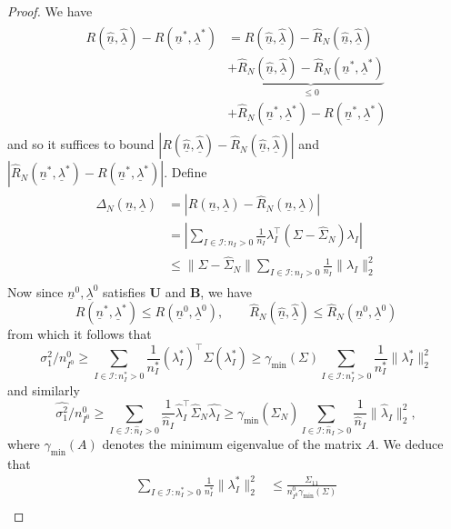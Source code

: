 \documentclass{article} %
\newcommand{\wh}[1]{\widehat{#1}}
\newcommand{\ul}[1]{\underline{#1}}
\begin{document}
\begin{proof}
    We have
    \begin{align}\label{eqn:R}
    \begin{split}
        R(\wh{\ul{n}},\wh{\ul{\lambda}}) - R({\ul{n}}^*,{\ul{\lambda}}^*) &= R(\wh{\ul{n}},\wh{\ul{\lambda}}) - \wh{R}_N(\wh{\ul{n}},\wh{\ul{\lambda}}) \\
        &+ \underbrace{\wh{R}_N(\wh{\ul{n}},\wh{\ul{\lambda}}) - \wh{R}_N({\ul{n}}^*,{\ul{\lambda}}^*)}_{\leq0} \\
        &+ \wh{R}_N({\ul{n}}^*,{\ul{\lambda}}^*) - R({\ul{n}}^*,{\ul{\lambda}}^*)
    \end{split}
    \end{align}
and so it suffices to bound $|R(\wh{\ul{n}},\wh{\ul{\lambda}}) - \wh{R}_N(\wh{\ul{n}},\wh{\ul{\lambda}})|$ and $|\wh{R}_N({\ul{n}}^*,{\ul{\lambda}}^*) - R({\ul{n}}^*,{\ul{\lambda}}^*)|$. Define
\begin{align}\label{eqn:Delta}
\begin{split}
    \Delta_N(\ul{n},\ul{\lambda}) &= |R({\ul{n}},{\ul{\lambda}}) - \wh{R}_N({\ul{n}},{\ul{\lambda}})| \\
    &=\left|\sum_{I\in\mathcal{I}:n_I>0}\frac{1}{n_I}\lambda_I^\top(\Sigma-\wh{\Sigma}_N)\lambda_I\right|\\
    &\leq \|\Sigma-\wh{\Sigma}_N\|\sum_{I\in\mathcal{I}:n_I>0}\frac{1}{n_I}\|\lambda_I\|_2^2
\end{split}
\end{align}
Now since $\ul{n}^0,\ul{\lambda}^0$ satisfies $\mathbf{U}$ and $\mathbf{B}$, we have
\[
R({\ul{n}}^*,{\ul{\lambda}}^*)\leq R(\ul{n}^0,\ul{\lambda}^0),\quad\quad \wh{R}_N(\wh{\ul{n}},\wh{\ul{\lambda}})\leq \wh{R}_N(\ul{n}^0,\ul{\lambda}^0)
\]
from which it follows that
\begin{equation}\label{eqn:bound-norm}
    \sigma^2_1/n^0_{I^0} \geq \sum_{I\in\mathcal{I}:n_I^*>0}\frac{1}{n_I^*}(\lambda_I^*)^\top\Sigma(\lambda_I^*) \geq \gamma_{\min}(\Sigma)\sum_{I\in\mathcal{I}:n_I^*>0} \frac{1}{n_I^*} \|\lambda_I^*\|_2^2
\end{equation}
and similarly
\[
\wh{\sigma^2_1}/n^0_{I^0} \geq \sum_{I\in\mathcal{I}:\wh{n}_I>0}\frac{1}{\wh{n}_I}\wh{\lambda}_I^\top\wh{\Sigma}_N\wh{\lambda_I} \geq \gamma_{\min}(\wh{\Sigma}_N)\sum_{I\in\mathcal{I}:\wh{n}_I>0} \frac{1}{\wh{n}_I} \|\wh{\lambda}_I\|_2^2,
\]
where $\gamma_{\min}(A)$ denotes the minimum eigenvalue of the matrix $A$. We deduce that
\begin{align*}
    \sum_{I\in\mathcal{I}:n_I^*>0} \frac{1}{n_I^*} \|\lambda_I^*\|_2^2 &\leq \frac{\Sigma_{11}}{n^0_{I^0}\gamma_{\min}(\Sigma)} \\

\end{align*}
\end{proof}
\end{document}
